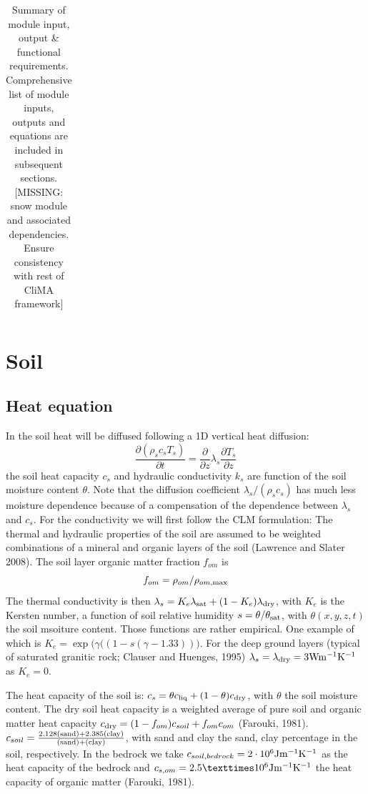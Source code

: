 \documentclass{article}
\begin{document}
\begin{table}[]
{\begin{tabular}{|l|l|l|l|}
\end{tabular}%
}
\caption{\label{tab:LM-modules}Summary of module input, output & functional requirements. Comprehensive list of module inputs, outputs and equations are included in subsequent sections. [MISSING: snow module and associated dependencies. Ensure consistency with rest of CliMA framework]}
\end{table}


\section{Soil}

\subsection{Heat equation}
In the soil heat will be diffused following a 1D vertical heat diffusion:
\begin{equation}
     \frac{\partial (\rho_s c_s T_s) }{\partial t} = \frac{\partial }{\partial z}\lambda_s \frac{\partial T_s }{\partial z}
\end{equation}
the soil heat capacity $c_s$ and hydraulic conductivity $k_s$ are function of the soil moisture content $\theta$. Note that the diffusion coefficient $\lambda_s/(\rho_s c_s)$ has much less moisture dependence because of a compensation of the dependence between $\lambda_s$ and $c_s$. 
For the conductivity we will first follow the CLM formulation:
The thermal and hydraulic properties of the soil are assumed to be weighted combinations of a mineral and organic layers of the soil (Lawrence and Slater 2008). The soil layer organic matter fraction $f_{om}$ is 
\begin{equation}
    f_{om} = \rho_{om}/\rho_{om,{\rm max}}
\end{equation}
The thermal conductivity is then $\lambda_s = K_e \lambda_{\rm sat} + (1-K_e) \lambda_{\rm dry}$, with $K_e$ is the Kersten number, a function of soil relative humidity $s=\theta/\theta_{\rm sat}$, with $\theta(x,y,z,t)$ the soil msoiture content. Those functions are rather empirical. One example of which is $K_e = \exp \big( \gamma((1-s(\gamma-1.33))\big)$. For  the  deep  ground  layers  (typical  of  saturated  granitic  rock;  Clauser  and  Huenges,  1995) $\lambda_s =  \lambda_{\rm dry} = 3 \rm W  m^{-1}  K^{-1}$ as $K_e=0$.

The heat capacity of the soil is:
$c_s=\theta c_{\rm liq} + (1-\theta) c_{\rm dry}$, with $\theta$ the soil moisture content.
The dry soil heat capacity is a weighted average of pure soil and organic matter heat capacity $c_{\rm dry} = (1-f_{om})c_{soil} + f_{om}c_{om}$ (Farouki, 1981).
$c_{soil} = {\rm \frac{2.128 (sand)+ 2.385 (clay)}{(sand) + (clay)}}$, with sand and clay the sand, clay percentage in the soil, respectively.
In the bedrock we take $c_{soil,bedrock} = 2 \cdot 10^6 {\rm J m^{-1} K^{-1}}$ as the heat capacity of the bedrock and $c_{s,om} = 2.5 ×10^6 {\rm J m^{-1} K^{-1}}$ the heat capacity of organic matter (Farouki, 1981).
\end{document}
